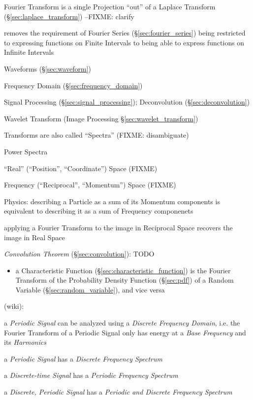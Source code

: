 Fourier Transform is a single Projection ``out'' of a Laplace Transform
(\S\ref{sec:laplace_transform}) --FIXME: clarify

removes the requirement of Fourier Series (\S\ref{sec:fourier_series}) being
restricted to expressing functions on Finite Intervals to being able to express
functions on Infinite Intervals

\fist Waveforms (\S\ref{sec:waveform})

\fist Frequency Domain (\S\ref{sec:frequency_domain})

\fist Signal Processing (\S\ref{sec:signal_processing}); Deconvolution
(\S\ref{sec:deconvolution})

\fist Wavelet Transform (Image Processing \S\ref{sec:wavelet_transform})

Transforms are also called ``Spectra'' (FIXME: disambiguate)

Power Spectra

``Real'' (``Position'', ``Coordinate'') Space (FIXME)

Frequency (``Reciprocal'', ``Momentum'') Space (FIXME)

Physics: describing a Particle as a sum of its Momentum components is equivalent
to describing it as a sum of Frequency componenets

applying a Fourier Transform to the image in Reciprocal Space recovers the image
in Real Space

\emph{Convolution Theorem} (\S\ref{sec:convolution}): TODO

\begin{itemize}
  \item a Characteristic Function (\S\ref{sec:characteristic_function}) is the
    Fourier Transform of the Probability Density Function (\S\ref{sec:pdf}) of a
    Random Variable (\S\ref{sec:random_variable}), and vice versa
\end{itemize}


(wiki):

a \emph{Periodic Signal} can be analyzed using a \emph{Discrete Frequency
  Domain}, i.e. the Fourier Transform of a Periodic Signal only has energy at a
\emph{Base Frequency} and its \emph{Harmonics}

a \emph{Periodic Signal} has a \emph{Discrete Frequency Spectrum}

a \emph{Discrete-time Signal} has a \emph{Periodic Frequency Spectrum}

a \emph{Discrete, Periodic Signal} has a \emph{Periodic and Discrete Frequency
  Spectrum}



